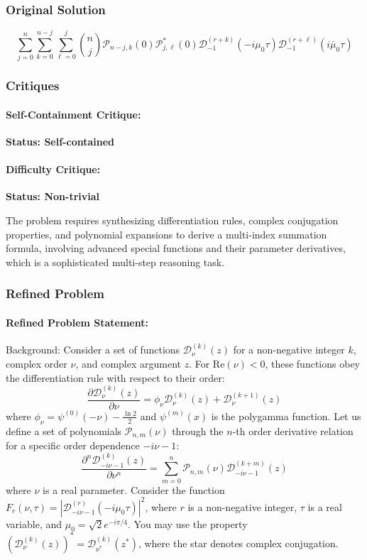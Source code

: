 \documentclass[10pt]{article}
\begin{document}
\subsubsection*{Original Solution}
\[ \sum_{j=0}^{n}\sum_{k=0}^{n-j}\sum_{\ell=0}^{j}\binom{n}{j}\mathcal{P}_{n-j,k}\left(0\right)\mathcal{P}^{*}_{j,\ell}\left(0\right)\mathcal{D}^{\left(r+k\right)}_{-1}\left(-i\mu_{0}\tau\right)\mathcal{D}^{\left(r+\ell\right)}_{-1}\left(i\bar{\mu}_0\tau\right) \]

\subsubsection*{Critiques}
\paragraph*{Self-Containment Critique:}
\textcolor{pass}{\textbf{Status: Self-contained}}




\paragraph*{Difficulty Critique:}
\textcolor{pass}{\textbf{Status: Non-trivial}}

The problem requires synthesizing differentiation rules, complex conjugation properties, and polynomial expansions to derive a multi-index summation formula, involving advanced special functions and their parameter derivatives, which is a sophisticated multi-step reasoning task.


\subsubsection*{Refined Problem}
\paragraph*{Refined Problem Statement:}
Background:
Consider a set of functions $\mathcal{D}^{\left(k\right)}_{\nu}\left(z\right)$ for a non-negative integer $k$, complex order $\nu$, and complex argument $z$. For $\mathrm{Re}(\nu) < 0$, these functions obey the differentiation rule with respect to their order:
$$ \frac{\partial \mathcal{D}^{\left(k\right)}_{\nu}\left(z\right)}{\partial \nu}=\phi_{\nu}\mathcal{D}^{\left(k\right)}_{\nu}\left(z\right)+\mathcal{D}^{\left(k+1\right)}_{\nu}\left(z\right) $$
where $\phi_{\nu}=\psi^{\left(0\right)}\left(-\nu\right)-\frac{\ln 2}{2}$ and $\psi^{(m)}(x)$ is the polygamma function. Let us define a set of polynomials $\mathcal{P}_{n,m}(\nu)$ through the $n$-th order derivative relation for a specific order dependence $-i\nu-1$:
$$ \frac{\partial^n \mathcal{D}^{\left(k\right)}_{-i\nu-1}\left(z\right)}{\partial \nu^n}=\sum_{m=0}^{n}\mathcal{P}_{n,m}\left(\nu\right)\mathcal{D}^{\left(k+m\right)}_{-i\nu-1}\left(z\right) $$
where $\nu$ is a real parameter. Consider the function $F_{r}(\nu, \tau) = \left|\mathcal{D}^{\left(r\right)}_{-i\nu-1}\left(-i\mu_0\tau\right)\right|^2$, where $r$ is a non-negative integer, $\tau$ is a real variable, and $\mu_0 = \sqrt{2}e^{-i\pi/4}$. You may use the property $(\mathcal{D}^{(k)}_{\nu}(z))^* = \mathcal{D}^{(k)}_{\nu^*}(z^*)$, where the star denotes complex conjugation.
\end{document}
